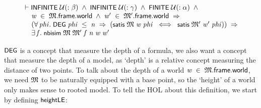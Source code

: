 \documentclass[letterpaper]{article}
\renewcommand{\HOLConst}[1]{{\textsf{\upshape\small #1}}}
\renewcommand{\HOLinline}[1]{\ensuremath{#1}}
\newenvironment{holmath}{\begin{displaymath}\begin{array}{l}}{\end{array}\end{displaymath}\ignorespacesafterend}
\begin{document}
\begin{holmath}
  \ensuremath{\HOLTokenTurnstile}\HOLConst{INFINITE}\;\ensuremath{\cal{U}}(:\ensuremath{\beta})\;\HOLSymConst{\HOLTokenConj{}}\;\HOLConst{INFINITE}\;\ensuremath{\cal{U}}(:\ensuremath{\gamma})\;\HOLSymConst{\HOLTokenConj{}}\;\HOLConst{FINITE}\;\ensuremath{\cal{U}}(:\ensuremath{\alpha})\;\HOLSymConst{\HOLTokenConj{}}\\
\;\;\;\;\;\HOLFreeVar{w}\;\HOLSymConst{\HOLTokenIn{}}\;\HOLFreeVar{\ensuremath{\mathfrak{M}}}.\HOLFieldName{frame}.\HOLFieldName{world}\;\HOLSymConst{\HOLTokenConj{}}\;\HOLFreeVar{w\sp{\prime}}\;\HOLSymConst{\HOLTokenIn{}}\;\HOLFreeVar{\ensuremath{\mathfrak{M}'}}.\HOLFieldName{frame}.\HOLFieldName{world}\;\HOLSymConst{\HOLTokenImp{}}\\
\;\;\;\;\;(\HOLSymConst{\HOLTokenForall{}}\HOLBoundVar{phi}.\;\HOLConst{DEG}\;\HOLBoundVar{phi}\;\HOLSymConst{\HOLTokenLeq{}}\;\HOLFreeVar{n}\;\HOLSymConst{\HOLTokenImp{}}\;(\HOLConst{satis}\;\HOLFreeVar{\ensuremath{\mathfrak{M}}}\;\HOLFreeVar{w}\;\HOLBoundVar{phi}\;\HOLSymConst{\HOLTokenEquiv{}}\;\HOLConst{satis}\;\HOLFreeVar{\ensuremath{\mathfrak{M}'}}\;\HOLFreeVar{w\sp{\prime}}\;\HOLBoundVar{phi}))\;\HOLSymConst{\HOLTokenImp{}}\\
\;\;\;\;\;\HOLSymConst{\HOLTokenExists{}}\HOLBoundVar{f}.\;\HOLConst{nbisim}\;\HOLFreeVar{\ensuremath{\mathfrak{M}}}\;\HOLFreeVar{\ensuremath{\mathfrak{M}'}}\;\HOLBoundVar{f}\;\HOLFreeVar{n}\;\HOLFreeVar{w}\;\HOLFreeVar{w\sp{\prime}}
\end{holmath} 


\HOLinline{\HOLConst{DEG}} is a concept that measure the depth of a formula, we also want a concept that measure the depth of a model, as `depth' is a relative concept measuring the distance of two points. To talk about the depth of a world \HOLinline{\HOLFreeVar{w}\;\HOLSymConst{\HOLTokenIn{}}\;\HOLFreeVar{\ensuremath{\mathfrak{M}}}.\HOLFieldName{frame}.\HOLFieldName{world}}, we need \HOLinline{\HOLFreeVar{\ensuremath{\mathfrak{M}}}} to be naturally equipped with a base point, so the `height' of a world only makes sense to rooted model. To tell the HOL about this definition, we start by defining \HOLinline{\HOLConst{heightLE}}:
\end{document}
